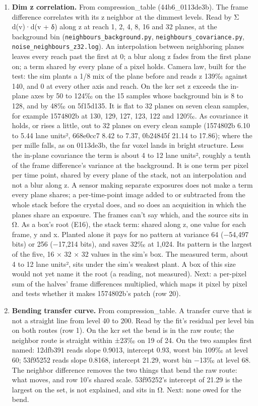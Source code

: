\begin{enumerate}
\item \textbf{Dim z correlation.} From compression\_\allowbreak{}table (44b6\_\allowbreak{}0113de3b). The frame difference correlates with its z neighbor at the dimmest levels. Read by Σ d(v)·d(v + δ) along z at reach 1, 2, 4, 8, 16 and 32 planes, at the background bin (\texttt{neighbours\_\allowbreak{}background.\allowbreak{}py}, \texttt{neighbours\_\allowbreak{}covariance.\allowbreak{}py}, \texttt{noise\_\allowbreak{}neighbours\_\allowbreak{}z32.\allowbreak{}log}). An interpolation between neighboring planes leaves every reach past the first at 0; a blur along z fades from the first plane on; a term shared by every plane of a pixel holds. Camera law, built for the test: the sim plants a 1/8 mix of the plane before and reads z 139‰ against 140, and 0 at every other axis and reach. On the kcr set z exceeds the in-plane axes by 50 to 124‰ on the 15 samples whose background bin is 8 to 128, and by 48‰ on 5f15d135. It is flat to 32 planes on seven clean samples, for example 1574802b at 130, 129, 127, 123, 122 and 120‰. As covariance it holds, or rises a little, out to 32 planes on every clean sample (1574802b 6.10 to 5.44 lane units², 668e0cc7 8.42 to 7.37, 0b24845f 21.14 to 17.86); where the per mille falls, as on 0113de3b, the far voxel lands in bright structure. Less the in-plane covariance the term is about 4 to 12 lane units², roughly a tenth of the frame difference's variance at the background. It is one term per pixel per time point, shared by every plane of the stack, not an interpolation and not a blur along z. A sensor making separate exposures does not make a term every plane shares; a per-time-point image added to or subtracted from the whole stack before the crystal does, and so does an acquisition in which the planes share an exposure. The frames can't say which, and the source sits in Ω. As a box's root (E16), the stack term: shared along z, one value for each frame, y and x. Planted alone it pays for no pattern at variance 64 (−54,497 bits) or 256 (−17,214 bits), and saves 32‰ at 1,024. Its pattern is the largest of the five, 16 × 32 × 32 values in the sim's box. The measured term, about 4 to 12 lane units², sits under the sim's weakest plant. A box of this size would not yet name it the root (a reading, not measured). Next: a per-pixel sum of the halves' frame differences multiplied, which maps it pixel by pixel and tests whether it makes 1574802b's patch (row 20).
\item \textbf{Bending transfer curve.} From compression\_\allowbreak{}table. A transfer curve that is not a straight line from level 40 to 200. Read by the fit's residual per level bin on both routes (row 1). On the kcr set the bend is in the raw route; the neighbor route is straight within ±23‰ on 19 of 24. On the two samples first named: 12dfb391 reads slope 0.9013, intercept 0.93, worst bin 109‰ at level 60; 53f95252 reads slope 0.8168, intercept 21.29, worst bin −13‰ at level 68. The neighbor difference removes the two things that bend the raw route: what moves, and row 10's shared scale. 53f95252's intercept of 21.29 is the largest on the set, is not explained, and sits in Ω. Next: none owed for the bend.

\end{enumerate}
